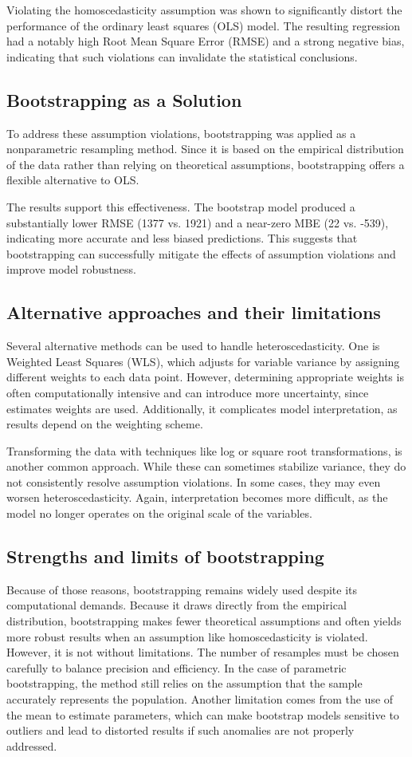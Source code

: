 Violating the homoscedasticity assumption was shown to significantly distort the performance of the ordinary least squares (OLS) model. The resulting regression had a notably high Root Mean Square Error (RMSE) and a strong negative bias, indicating that such violations can invalidate the statistical conclusions. 

\subsection{Bootstrapping as a Solution}
To address these assumption violations, bootstrapping was applied as a nonparametric resampling method. Since it is based on the empirical distribution of the data rather than relying on theoretical assumptions, bootstrapping offers a flexible alternative to OLS.

The results support this effectiveness. The bootstrap model produced a substantially lower RMSE (1377 vs. 1921) and a near-zero MBE (22 vs. -539), indicating more accurate and less biased predictions. This suggests that bootstrapping can successfully mitigate the effects of assumption violations and improve model robustness.

\subsection{Alternative approaches and their limitations}
Several alternative methods can be used to handle heteroscedasticity. One is Weighted Least Squares (WLS), which adjusts for variable variance by assigning different weights to each data point. However, determining appropriate weights is often computationally intensive and can introduce more uncertainty, since estimates weights are used. Additionally, it complicates model interpretation, as results depend on the weighting scheme.

Transforming the data with techniques like log or square root transformations, is another common approach. While these can sometimes stabilize variance, they do not consistently resolve assumption violations. In some cases, they may even worsen heteroscedasticity. Again, interpretation becomes more difficult, as the model no longer operates on the original scale of the variables.


\subsection{Strengths and limits of bootstrapping}
Because of those reasons, bootstrapping remains widely used despite its computational demands. Because it draws directly from the empirical distribution, bootstrapping makes fewer theoretical assumptions and often yields more robust results when an assumption like homoscedasticity is violated. However, it is not without limitations. The number of resamples must be chosen carefully to balance precision and efficiency. In the case of parametric bootstrapping, the method still relies on the assumption that the sample accurately represents the population. Another limitation comes from the use of the mean to estimate parameters, which can make bootstrap models sensitive to outliers and lead to distorted results if such anomalies are not properly addressed.
